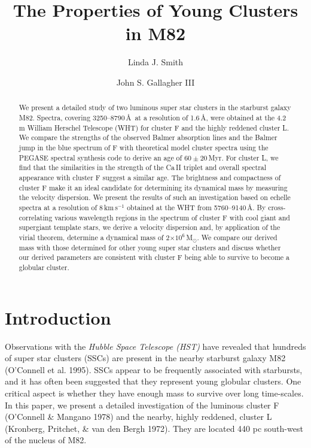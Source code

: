 \pagestyle{myheadings}

\title{The Properties of Young Clusters in M82}
 \author{Linda J. Smith}
\author{John S. Gallagher III}
%
\begin{abstract}
We present a detailed study of two luminous super star clusters in the
starburst galaxy M82. Spectra, covering 3250--8790\,\AA\ at a
resolution of 1.6\,\AA, were obtained at the 4.2\,m William Herschel
Telescope (WHT) for cluster F and the highly reddened cluster L.  We
compare the strengths of the observed Balmer absorption lines and the
Balmer jump in the blue spectrum of F with theoretical model cluster
spectra using the PEGASE spectral synthesis code to derive an age of
$60\pm20$\,Myr. For cluster L, we find that the similarities in the
strength of the Ca\,II triplet and overall spectral appearance with
cluster F suggest a similar age.  The brightness and compactness of
cluster F make it an ideal candidate for determining its dynamical
mass by measuring the velocity dispersion.  We present the results of
such an investigation based on echelle spectra at a resolution of
8\,km\,s$^{-1}$ obtained at the WHT from 5760--9140\,\AA.
By cross-correlating various wavelength
regions in the spectrum of cluster F with cool giant and supergiant
template stars, we derive a velocity dispersion and, by application of
the virial theorem, determine a dynamical mass of 2$\times
10^6$\,M$_\odot$.  We compare our derived mass with those determined
for other young super star clusters and discuss whether our derived
parameters are consistent with cluster F being able to survive to
become a globular cluster.
\end{abstract}


\section{Introduction}
Observations with the {\it Hubble Space Telescope (HST)} have revealed
that hundreds of super star clusters (SSCs) are present in the nearby
starburst galaxy M82 (O'Connell et al. 1995). SSCs appear to be
frequently associated with starbursts, and it has often been suggested
that they represent young globular clusters.
One critical aspect is whether they have enough mass to survive over long
time-scales. In this paper, we present a detailed investigation
of the luminous cluster F (O'Connell \& Mangano 1978) and the nearby,
highly reddened, cluster L (Kronberg, Pritchet, \& van den Bergh 1972).
They are located 440 pc south-west of the nucleus of M82.

